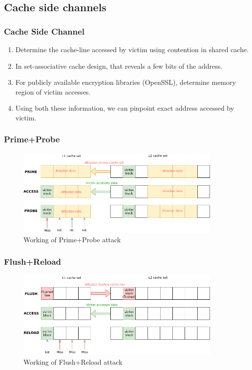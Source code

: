 \documentclass[10pt]{beamer}
\begin{document}
\subsection{Cache side channels}
\begin{frame}
\frametitle{Cache Side Channel}
\begin{enumerate}
    \item Determine the cache-line accessed by victim using contention in shared cache.
    \item In set-associative cache design, that reveals a few bits of the address.
    \item For publicly available encryption libraries (OpenSSL), determine memory region of victim accesses.
    \item Using both these information, we can pinpoint exact address accessed by victim.
\end{enumerate}
\end{frame}

\begin{frame}
\frametitle{Prime+Probe}
\begin{figure}
\includegraphics[width=0.9\textwidth]{prime_probe}
\caption{Working of Prime+Probe attack}
\end{figure}
\end{frame}

\begin{frame}
\frametitle{Flush+Reload}
\begin{figure}
\includegraphics[width=0.9\textwidth]{flush_reload}
\caption{Working of Flush+Reload attack}
\end{figure}
\end{frame}
\end{document}

